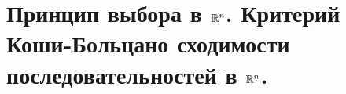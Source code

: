 \documentclass[../main.tex]{subfiles}
\begin{document}
\newpage
\section{Принцип выбора в \( \mathbb{R} ^n\). Критерий Коши-Больцано сходимости последовательностей в \( \mathbb{R} ^n\).}
\end{document}
